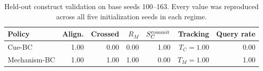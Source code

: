 
\begin{table}[t]
  \centering
  \small
  \setlength{\tabcolsep}{4.5pt}
  \begin{tabular}{lrrrrrr}
    \toprule
    Policy & Align. & Crossed & $R_M$ & $S_C^{\rm commit}$ & Tracking & Query rate \\
    \midrule
    Cue-BC & 1.00 & 0.00 & 0.00 & 1.00 & $T_C=1.00$ & 0.00 \\
    Mechanism-BC & 1.00 & 1.00 & 1.00 & 0.00 & $T_M=1.00$ & 1.00 \\
    \bottomrule
  \end{tabular}
  \caption{Held-out construct validation on base seeds 100--163. Every value was
  reproduced across all five initialization seeds in each regime.}
  \label{tab:bc}
\end{table}
